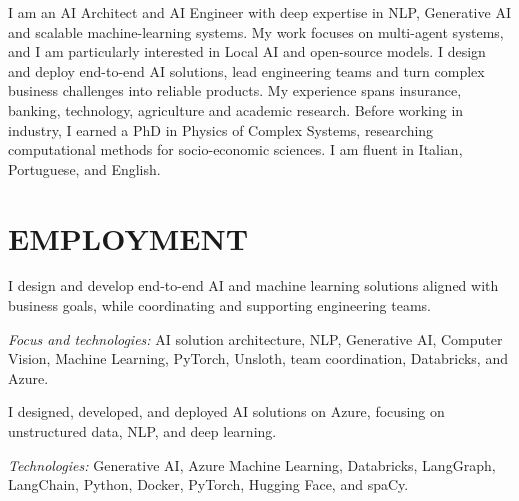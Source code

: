 \documentclass[11pt,a4paper,roman]{moderncv}        %
\begin{document}
\makecvtitle
{}

\small{I am an AI Architect and AI Engineer with deep expertise in NLP, Generative AI and scalable machine-learning systems. My work focuses on multi-agent systems, and I am particularly interested in Local AI and open-source models. I design and deploy end-to-end AI solutions, lead engineering teams and turn complex business challenges into reliable products. My experience spans insurance, banking, technology, agriculture and academic research. Before working in industry, I earned a PhD in Physics of Complex Systems, researching computational methods for socio-economic sciences. I am fluent in Italian, Portuguese, and English.}

\section{EMPLOYMENT}

I design and develop end-to-end AI and machine learning solutions aligned with business goals, while coordinating and supporting engineering teams.

\vspace{1pt}
\textit{Focus and technologies:} AI solution architecture, NLP, Generative AI, Computer Vision, Machine Learning, PyTorch, Unsloth, team coordination, Databricks, and Azure.

\vspace{10pt}

I designed, developed, and deployed AI solutions on Azure, focusing on unstructured data, NLP, and deep learning.

\vspace{1pt}
\textit{Technologies:} Generative AI, Azure Machine Learning, Databricks, LangGraph, LangChain, Python, Docker, PyTorch, Hugging Face, and spaCy.

\vspace{10pt}
\end{document}
